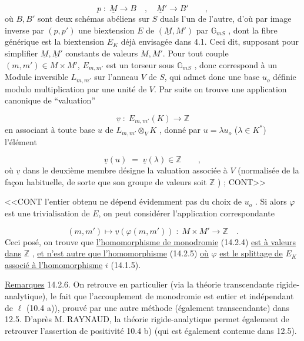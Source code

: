 \begin{equation*}
p \;:\; \underline{M} \longrightarrow B \quad , \quad \underline{M}' \longrightarrow B' \qquad ,
\end{equation*}
où $B,B'$ sont deux schémas abéliens sur $S$ duals l'un de l'autre, d'où par image inverse par $(p,p')$ une biextension $E$ de $(\underline{M},M')$ par $\mathbb{G}_{mS}$ , dont la fibre générique est la biextension $E_K$ déjà envisagée dans 4.1. Ceci dit, supposant pour simplifier $\underline{M},\underline{M}'$ constants de valeurs $M,M'$. Pour tout couple $(m,m') \in M \times M'$, $E_{m,m'}$ est un torseur sous $\mathbb{G}_{mS}$ , donc correspond à un Module inversible $L_{m,m'}$ sur l'anneau $V$ de $S$, qui admet donc une base $u_o$ définie modulo multiplication par une unité de $V$. Par suite on trouve une application canonique de ``valuation''

\begin{equation*}
\underline{v} \;:\; E_{m,m'}(K) \longrightarrow \mathbb{Z}
\end{equation*}
en associant à toute base $u$ de $L_{m,m'} \otimes_V K$ , donné par $u = \lambda u_o$ ($\lambda \in K^*$) l'élément

\begin{equation*}
\underline{v}(u) \;=\; \underline{v}(\lambda) \in \mathbb{Z} \qquad ,
\end{equation*}
où $\underline{v}$ dans le deuxième membre désigne la valuation associée à $V$ (normalisée de la façon habituelle, de sorte que son groupe de valeurs soit $\mathbb{Z}$ ) ; CONT>>



<<CONT l'entier obtenu ne dépend évidemment pas du choix de $u_o$ . Si alors $\varphi$ est une trivialisation de $E$, on peut considérer l'application correspondante

\begin{equation}\tag{14.2.5}
(m,m') \longmapsto \underline{v}(\varphi(m,m')) \; : \; M \times M' \longrightarrow \mathbb{Z} \quad .
\end{equation}
Ceci posé, on trouve que \underline{l'homomorphisme de monodromie} (14.2.4) \underline{est à valeurs dans} $\mathbb{Z}$ , \underline{et n'est autre que l'homomorphisme} (14.2.5) \underline{où} $\varphi$ \underline{est le splittage de} $E_K$ \underline{associé à l'homomorphisme} $i$ (14.1.5).

\underline{Remarques} 14.2.6. On retrouve en particulier (via la théorie transcendante rigide-analytique), le fait que l'accouplement de monodromie est entier et indépendant de $\ell$ (10.4 a)), prouvé par une autre méthode (également transcendante) dans 12.5. D'après M. RAYNAUD, la théorie rigide-analytique permet également de retrouver l'assertion de positivité 10.4 b) (qui est également contenue dans 12.5).

